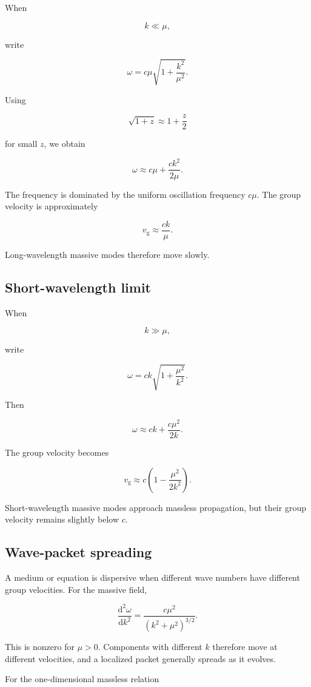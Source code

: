 When

\[
k\ll\mu,
\]

write

\[
\omega
=
c\mu
\sqrt{1+
\frac{k^{2}}{\mu^{2}}}.
\]

Using

\[
\sqrt{1+z}
\approx
1+
\frac{z}{2}
\]

for small \(z\), we obtain

\[
\boxed{
\omega
\approx
c\mu
+
\frac{c k^{2}}{2\mu}
}.
\]

The frequency is dominated by the uniform oscillation frequency \(c\mu\). The group velocity is approximately

\[
\boxed{
v_{\mathrm{g}}
\approx
\frac{ck}{\mu}
}.
\]

Long-wavelength massive modes therefore move slowly.

\subsection{Short-wavelength limit}

When

\[
k\gg\mu,
\]

write

\[
\omega
=
ck
\sqrt{1+
\frac{\mu^{2}}{k^{2}}}.
\]

Then

\[
\boxed{
\omega
\approx
ck
+
\frac{c\mu^{2}}{2k}
}.
\]

The group velocity becomes

\[
\boxed{
v_{\mathrm{g}}
\approx
c
\left(
1-
\frac{\mu^{2}}{2k^{2}}
\right)
}.
\]

Short-wavelength massive modes approach massless propagation, but their group velocity remains slightly below \(c\).

\subsection{Wave-packet spreading}

A medium or equation is dispersive when different wave numbers have different group velocities. For the massive field,

\[
\frac{\mathrm{d}^{2}\omega}{\mathrm{d}k^{2}}
=
\frac{c\mu^{2}}
{(k^{2}+\mu^{2})^{3/2}}.
\]

This is nonzero for \(\mu>0\). Components with different \(k\) therefore move at different velocities, and a localized packet generally spreads as it evolves.

For the one-dimensional massless relation

